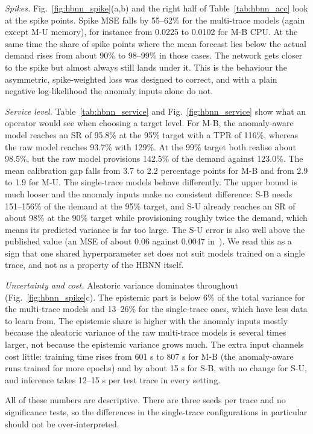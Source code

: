\documentclass[conference]{IEEEtran}
\begin{document}
\textit{Spikes.}
Fig.~\ref{fig:hbnn_spike}(a,b) and the right half of Table~\ref{tab:hbnn_acc} look at the spike points. Spike MSE falls by 55--62\% for the multi-trace models (again except M-U memory), for instance from 0.0225 to 0.0102 for M-B CPU. At the same time the share of spike points where the mean forecast lies below the actual demand rises from about 90\% to 98--99\% in those cases. The network gets closer to the spike but almost always still lands under it. This is the behaviour the asymmetric, spike-weighted loss was designed to correct, and with a plain negative log-likelihood the anomaly inputs alone do not.

\textit{Service level.}
Table~\ref{tab:hbnn_service} and Fig.~\ref{fig:hbnn_service} show what an operator would see when choosing a target level. For M-B, the anomaly-aware model reaches an SR of 95.8\% at the 95\% target with a TPR of 116\%, whereas the raw model reaches 93.7\% with 129\%. At the 99\% target both realise about 98.5\%, but the raw model provisions 142.5\% of the demand against 123.0\%. The mean calibration gap falls from 3.7 to 2.2 percentage points for M-B and from 2.9 to 1.9 for M-U. The single-trace models behave differently. The upper bound is much looser and the anomaly inputs make no consistent difference: S-B needs 151--156\% of the demand at the 95\% target, and S-U already reaches an SR of about 98\% at the 90\% target while provisioning roughly twice the demand, which means its predicted variance is far too large. The S-U error is also well above the published value (an MSE of about 0.06 against 0.0047 in~\cite{rossi2025}). We read this as a sign that one shared hyperparameter set does not suit models trained on a single trace, and not as a property of the HBNN itself.

\textit{Uncertainty and cost.}
Aleatoric variance dominates throughout (Fig.~\ref{fig:hbnn_spike}c). The epistemic part is below 6\% of the total variance for the multi-trace models and 13--26\% for the single-trace ones, which have less data to learn from. The epistemic share is higher with the anomaly inputs mostly because the aleatoric variance of the raw multi-trace models is several times larger, not because the epistemic variance grows much. The extra input channels cost little: training time rises from 601 s to 807 s for M-B (the anomaly-aware runs trained for more epochs) and by about 15 s for S-B, with no change for S-U, and inference takes 12--15 s per test trace in every setting.

All of these numbers are descriptive. There are three seeds per trace and no significance tests, so the differences in the single-trace configurations in particular should not be over-interpreted.
\end{document}
